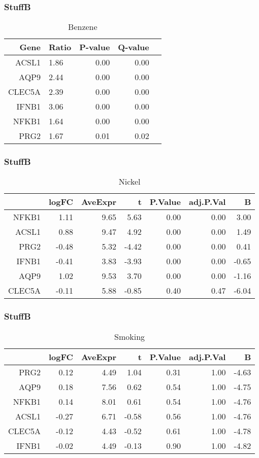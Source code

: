 \documentclass{beamer}
\begin{document}
\begin{frame}[fragile]
  	\frametitle{StuffB}
 		\begin{table}[ht]
		\caption {Benzene} \label{tab:benzene} 
		\centering
		\begin{tabular}{rlrrr}
  			\hline
 			Gene & Ratio & P-value & Q-value \\ 
  			\hline
			ACSL1 & 1.86 & 0.00 & 0.00 \\ 
  			AQP9 & 2.44 & 0.00 & 0.00 \\ 
  			CLEC5A & 2.39 & 0.00 & 0.00 \\ 
  			IFNB1 & 3.06 & 0.00 & 0.00 \\ 
  			NFKB1 & 1.64 & 0.00 & 0.00 \\ 
  			PRG2 & 1.67 & 0.01 & 0.02 \\ 
   			\hline
		\end{tabular}
		\end{table}
\end{frame}


\begin{frame}[fragile]
  	\frametitle{StuffB}
 		\begin{table}[ht]
		\caption {Nickel} \label{tab:nickel} 
		\centering
		\begin{tabular}{rrrrrrr}
 			\hline
 			& logFC & AveExpr & t & P.Value & adj.P.Val & B \\ 
  			\hline
			NFKB1 & 1.11 & 9.65 & 5.63 & 0.00 & 0.00 & 3.00 \\ 
  			ACSL1 & 0.88 & 9.47 & 4.92 & 0.00 & 0.00 & 1.49 \\ 
  			PRG2 & -0.48 & 5.32 & -4.42 & 0.00 & 0.00 & 0.41 \\ 
  			IFNB1 & -0.41 & 3.83 & -3.93 & 0.00 & 0.00 & -0.65 \\ 
  			AQP9 & 1.02 & 9.53 & 3.70 & 0.00 & 0.00 & -1.16 \\ 
  			CLEC5A & -0.11 & 5.88 & -0.85 & 0.40 & 0.47 & -6.04 \\ 
  			 \hline
		\end{tabular}
		\end{table}
\end{frame}

\begin{frame}[fragile]
  	\frametitle{StuffB}
 		\begin{table}[ht]
		\caption {Smoking} \label{tab:smoking} 
		\centering
		\begin{tabular}{rrrrrrr}
 		 \hline
 		& logFC & AveExpr & t & P.Value & adj.P.Val & B \\ 
 		 \hline
		PRG2 & 0.12 & 4.49 & 1.04 & 0.31 & 1.00 & -4.63 \\ 
  		AQP9 & 0.18 & 7.56 & 0.62 & 0.54 & 1.00 & -4.75 \\ 
  		NFKB1 & 0.14 & 8.01 & 0.61 & 0.54 & 1.00 & -4.76 \\ 
  		ACSL1 & -0.27 & 6.71 & -0.58 & 0.56 & 1.00 & -4.76 \\ 
  		CLEC5A & -0.12 & 4.43 & -0.52 & 0.61 & 1.00 & -4.78 \\ 
  		IFNB1 & -0.02 & 4.49 & -0.13 & 0.90 & 1.00 & -4.82 \\ 
  		\hline
		\end{tabular}
		\end{table}
\end{frame}
\end{document}
